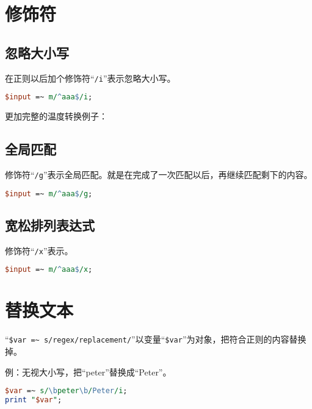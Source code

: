 



\section{修饰符}

\subsection{忽略大小写}

在正则以后加个修饰符“\verb|/i|”表示忽略大小写。

\begin{lstlisting}[language=Perl]
$input =~ m/^aaa$/i;
\end{lstlisting}

更加完整的温度转换例子：



\subsection{全局匹配}

修饰符“\verb|/g|”表示全局匹配。就是在完成了一次匹配以后，再继续匹配剩下的内容。

\begin{lstlisting}[language=Perl]
$input =~ m/^aaa$/g;
\end{lstlisting}

\subsection{宽松排列表达式}

修饰符“\verb|/x|”表示。

\begin{lstlisting}[language=Perl]
$input =~ m/^aaa$/x;
\end{lstlisting}



\section{替换文本}

“\verb|$var =~ s/regex/replacement/|”以变量“\verb|$var|”为对象，把符合正则的内容替换掉。

例：无视大小写，把“peter”替换成“Peter”。

\begin{lstlisting}[language=Perl]
$var =~ s/\bpeter\b/Peter/i;
print "$var";
\end{lstlisting}

